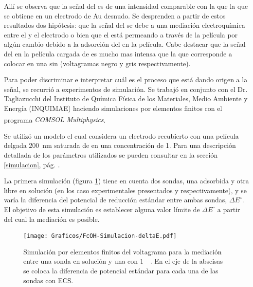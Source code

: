 		Allí se observa que la señal del \fc\space es de una intensidad comparable con la que la que se obtiene en un electrodo de Au  desnudo. Se desprenden a partir de estos resultados dos hipótesis: que la señal del \fc\space se debe a una mediación electroquímica entre el \ru\space y el electrodo o bien que el \fc\space está permeando a través de la película por algún cambio debido a la adsorción del \ru\space en la película. Cabe destacar que la señal del \fc\space en la película cargada de \ru\space es mucho mas intensa que la que corresponde a colocar \fc\space en una \pdmF\space sin \ru\space (voltagramas negro y gris respectivamente).

		Para poder discriminar e interpretar cuál es el proceso que está dando origen a la señal, se recurrió a experimentos de simulación. Se trabajó en conjunto con el Dr. Tagliazucchi del Instituto de Química Física de los Materiales, Medio Ambiente y Energía (INQUIMAE) haciendo simulaciones por elementos finitos con el programa \textit{COMSOL Multiphysics\textsuperscript\textregistered}.

		Se utilizó un modelo el cual considera un electrodo recubierto con una película delgada \SI{200}{nm} saturada de  \aminorutenio en una concentración de \SI{1}{\Molar}. Para una descripción detallada de los parámetros utilizados se pueden consultar en la sección \ref{simulacion}, pág. \pageref{simulacion}. 

		La primera simulación (figura \ref{fig:sim_mediacion}) tiene en cuenta dos sondas, una adsorbida y otra libre en solución (en los caso experimentales presentados \ru\space y \fc\space respectivamente), y se varía la diferencia del potencial de reducción estándar entre ambas sondas, $\Delta E^\circ$. El objetivo de esta simulación es establecer alguna valor límite de $\Delta E^\circ$ a partir del cual la mediación es posible. 

			\begin{figure}[ht]
					\centering
					\vspace*{-2mm}
			 	    \texttt{[image: Graficos/FcOH-Simulacion-deltaE.pdf]}
			 	    \vspace*{-3mm}
			        \caption[Simulación EQ de mediación redox]{Simulación por elementos finitos del voltagrama para la mediación entre una sonda en solución y una \pdmF\space con \ru\space \SI{1}{\milli\Molar}. En el eje de la abscisas se coloca la diferencia de potencial estándar para cada una de las sondas con ECS.}
			        \label{fig:sim_mediacion}\vspace*{3mm}
			      	\end{figure}

